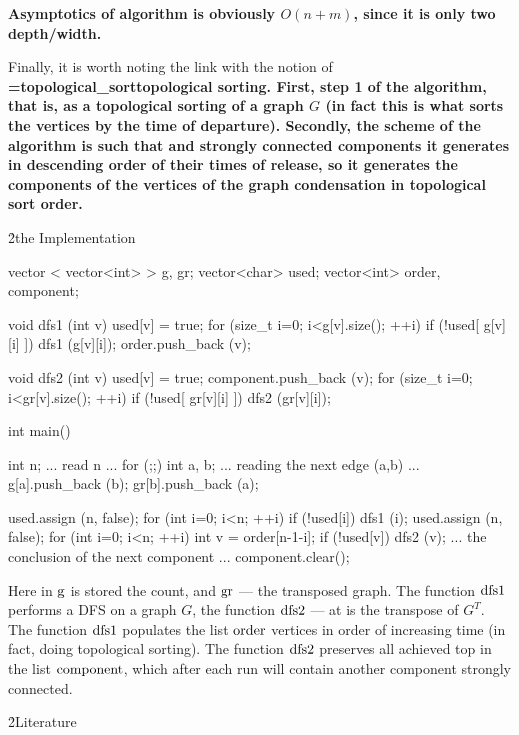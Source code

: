 \bf{Asymptotics} of algorithm is obviously $O(n+m)$, since it is only two depth/width.

Finally, it is worth noting the link with the notion of \bf{\algohref=topological_sort{topological sorting}}. First, step 1 of the algorithm, that is, as a topological sorting of a graph $G$ (in fact this is what sorts the vertices by the time of departure). Secondly, the scheme of the algorithm is such that and strongly connected components it generates in descending order of their times of release, so it generates the components of the vertices of the graph condensation in topological sort order.

\h2{the Implementation}

\code
vector < vector<int> > g, gr;
vector<char> used;
vector<int> order, component;

void dfs1 (int v) {
used[v] = true;
for (size_t i=0; i<g[v].size(); ++i)
if (!used[ g[v][i] ])
dfs1 (g[v][i]);
order.push_back (v);
}

void dfs2 (int v) {
used[v] = true;
component.push_back (v);
for (size_t i=0; i<gr[v].size(); ++i)
if (!used[ gr[v][i] ])
dfs2 (gr[v][i]);
}

int main() {
int n;
... read n ...
for (;;) {
int a, b;
... reading the next edge (a,b) ...
g[a].push_back (b);
gr[b].push_back (a);
}

used.assign (n, false);
for (int i=0; i<n; ++i)
if (!used[i])
dfs1 (i);
used.assign (n, false);
for (int i=0; i<n; ++i) {
int v = order[n-1-i];
if (!used[v]) {
dfs2 (v);
... the conclusion of the next component ...
component.clear();
}
}
}
\endcode

Here in $\rm g$ is stored the count, and $\rm gr$ --- the transposed graph. The function $\rm dfs1$ performs a DFS on a graph $G$, the function $\rm dfs2$ --- at is the transpose of $G^T$. The function $\rm dfs1$ populates the list $\rm order$ vertices in order of increasing time (in fact, doing topological sorting). The function $\rm dfs2$ preserves all achieved top in the list $\rm component$, which after each run will contain another component strongly connected.

\h2{Literature}

\ul{
\li {}
\li {}
}